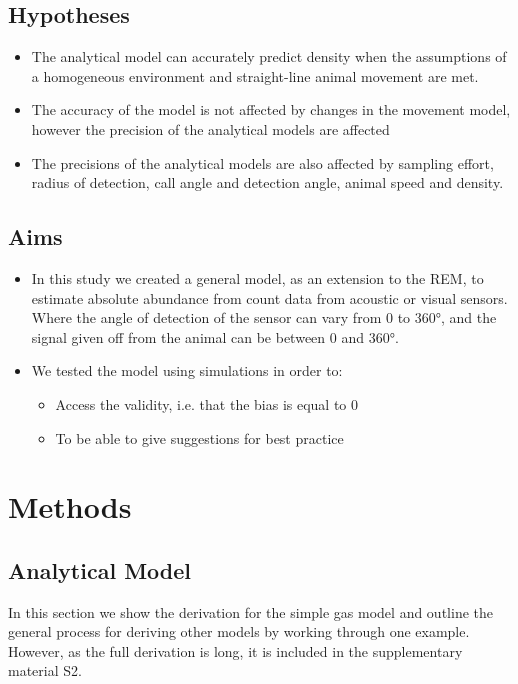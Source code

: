 \documentclass[a4paper,10pt,reqno,oneside]{amsart}
\begin{document}
\subsection{Hypotheses}

\begin{itemize}
\item The analytical model can accurately predict density when the assumptions of a homogeneous environment and straight-line animal movement are met.
\item The accuracy of the model is not affected by changes in the movement model, however the precision of the analytical models are affected
\item The precisions of the analytical models are also affected by sampling effort, radius of detection, call angle and detection angle, animal speed and density.
\end{itemize}

\subsection{Aims}

\begin{itemize}
\item  In this study we created a general model, as an extension to the REM, to estimate absolute abundance from count data from acoustic or visual sensors. Where the angle of detection of the sensor can vary from 0 to 360°, and the signal given off from the animal can be between 0 and 360°.
\item  We tested the model using simulations in order to:
\begin{itemize}
\item Access the validity, i.e. that the bias is equal to 0
\item  To be able to give suggestions for best practice
\end{itemize}
\end{itemize}


\section{Methods}

\subsection{Analytical Model}

In this section we show the derivation for the simple gas model and outline the general process for deriving other models by working through one example. However, as the full derivation is long, it is included in the supplementary material S2.
\end{document}
